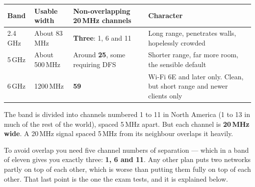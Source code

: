 \begin{longtable}{@{}L{2.4cm}L{3.4cm}L{4.2cm}L{4.9cm}@{}}
\toprule
{}
\textbf{Band} & \textbf{Usable width} & \textbf{Non-overlapping 20\,MHz channels} & \textbf{Character} \\
\midrule
{}\,GHz & About 83\,MHz &
\textbf{Three}: 1, 6 and 11 &
Long range, penetrates walls, hopelessly crowded \\
5\,GHz & About 500\,MHz &
Around \textbf{25}, some requiring DFS &
Shorter range, far more room, the sensible default \\
6\,GHz & 1200\,MHz &
\textbf{59} &
Wi-Fi 6E and later only. Clean, but short range and newer clients only \\
\bottomrule
\end{longtable}

\begin{alertbox}
The band is divided into channels numbered 1 to 11 in North America (1 to 13 in
much of the rest of the world), spaced 5\,MHz apart. But each channel is
\textbf{20\,MHz wide}. A 20\,MHz signal spaced 5\,MHz from its neighbour overlaps
it heavily.

To avoid overlap you need five channel numbers of separation --- which in a band
of eleven gives you exactly three: \textbf{1, 6 and 11}. Any other plan puts two
networks partly on top of each other, which is worse than putting them fully on
top of each other. That last point is the one the exam tests, and it is explained
below.
\end{alertbox}

